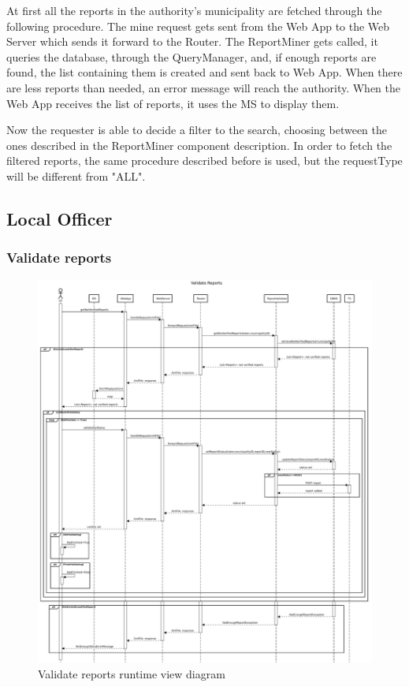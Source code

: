 						At first all the reports in the authority's municipality are fetched through the following procedure. The mine request gets sent from the Web App to the Web Server which sends it forward to the Router. The ReportMiner gets called, it queries the database, through the QueryManager, and, if enough reports are found, the list containing them is created and sent back to Web App. When there are less reports than needed, an error message will reach the authority. When the Web App receives the list of reports, it uses the MS to display them. 
						
						Now the requester is able to decide a filter to the search, choosing between the ones described in the ReportMiner component description. In order to fetch the filtered reports, the same procedure described before is used, but the requestType will be different from "ALL".
			\clearpage
			\subsection{Local Officer}
				\subsubsection{Validate reports}
					\begin{figure}[!h]
						\centering
						\includegraphics[width=\textwidth]{images/DD2/RuntimeView/Authority/LO/ValidateReports.pdf}
						\caption{Validate reports runtime view diagram}
					\end{figure}
